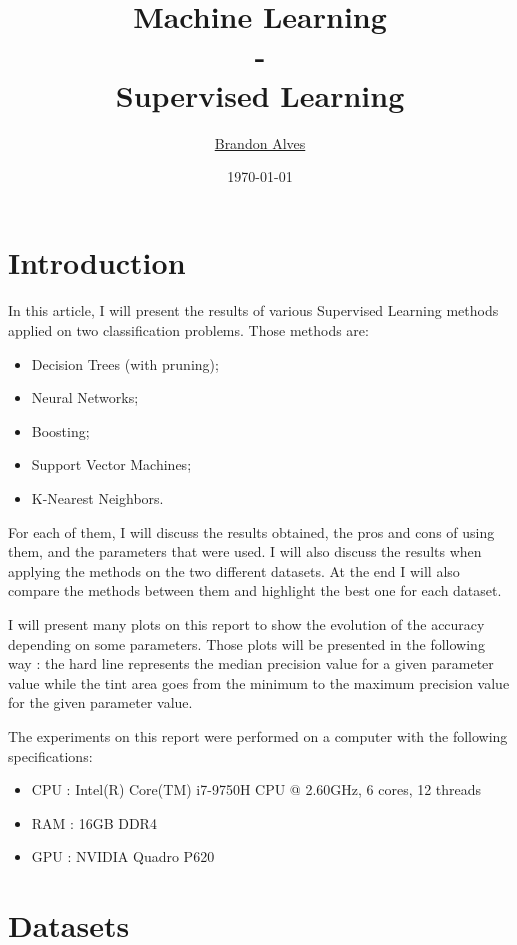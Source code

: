 \documentclass[10pt]{article}
\title{
	Machine Learning
	\\-\\
	Supervised Learning
}
\author{
	\href{mailto:brandon.alves@gatech.edu}{Brandon Alves}
}
\date{\today}
\begin{document}
	\maketitle
	\thispagestyle{empty}
	\tableofcontents
	\listoffigures
	\clearpage
	\setcounter{page}{1}
	\section{Introduction}
		\paragraph*{}
			In this article, I will present the results of various Supervised Learning methods applied on two classification problems. Those methods are:
			\begin{itemize}
				\item Decision Trees (with pruning);
				\item Neural Networks;
				\item Boosting;
				\item Support Vector Machines;
				\item K-Nearest Neighbors.
			\end{itemize}
			For each of them, I will discuss the results obtained, the pros and cons of using them, and the parameters that were used. I will also discuss the results when applying the methods on the two different datasets. At the end I will also compare the methods between them and highlight the best one for each dataset.

			I will present many plots on this report to show the evolution of the accuracy depending on some parameters. Those plots will be presented in the following way : the hard line represents the median precision value for a given parameter value while the tint area goes from the minimum to the maximum precision value for the given parameter value.

			The experiments on this report were performed on a computer with the following specifications:
			\begin{itemize}
				\item CPU : Intel(R) Core(TM) i7-9750H CPU @ 2.60GHz, 6 cores, 12 threads
				\item RAM : 16GB DDR4
				\item GPU : NVIDIA Quadro P620
			\end{itemize}
	\section{Datasets}
\end{document}
